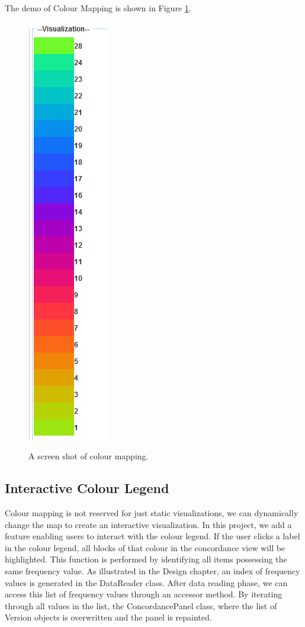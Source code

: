 The demo of Colour Mapping is shown in Figure \ref{fig:colourMapping}.
\begin{figure}[H]
	\centering	
	\includegraphics[scale=0.5]{Figs/Color-Mapping}\\[1ex]
	\caption{A screen shot of colour mapping.}
	\label{fig:colourMapping}
\end{figure} 

\subsection{Interactive Colour Legend}

Colour mapping is not reserved for just static visualizations, we can dynamically change the map to create an interactive visualization. In this project, we add a feature enabling users to interact with the colour legend. If the user clicks a label in the colour legend, all blocks of that colour in the concordance view will be highlighted. This function is performed by identifying all items possessing the same frequency value. As illustrated in the Design chapter, an index of frequency values is generated in the DataReader class. After data reading phase, we can access this list of frequency values through an accessor method. By iterating through all values in the list, the ConcordancePanel class, where the list of Version objects is overwritten and the panel is repainted.

